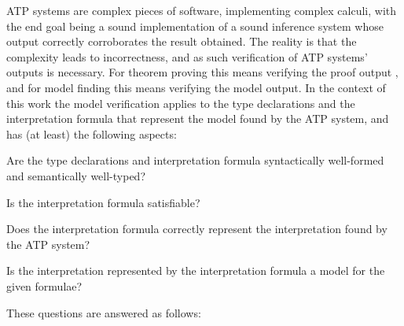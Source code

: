 \documentclass{easychair}
\newenvironment{packed_enumerate}{
\vspace*{-0.2em}
\begin{enumerate}
\setlength{\partopsep}{0pt}
\setlength{\itemsep}{1pt}
\setlength{\parskip}{0pt}
\setlength{\parsep}{0pt}
}{\end{enumerate}}
\begin{document}
ATP systems are complex pieces of software, implementing complex calculi, with the end goal
being a sound implementation of a sound inference system whose output correctly corroborates the
result obtained.
The reality is that the complexity leads to incorrectness, and as such verification of ATP systems'
outputs is necessary. 
For theorem proving this means verifying the proof output \cite{Sut06}, and for model finding 
this means verifying the model output.
In the context of this work the model verification applies to the type declarations and 
the interpretation formula that represent the model found by the ATP system, and
has (at least) the following aspects:
\begin{packed_enumerate}
\item Are the type declarations and interpretation formula syntactically well-formed 
      and semantically well-typed?
\item Is the interpretation formula satisfiable?
\item Does the interpretation formula correctly represent the interpretation found by the 
      ATP system?
\item Is the interpretation represented by the interpretation formula a model for the given 
      formulae?
\end{packed_enumerate}
\noindent
These questions are answered as follows:
\end{document}

